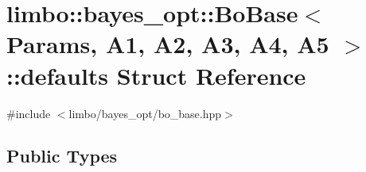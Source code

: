 \hypertarget{structlimbo_1_1bayes__opt_1_1_bo_base_1_1defaults}{}\section{limbo\+:\+:bayes\+\_\+opt\+:\+:Bo\+Base$<$ Params, A1, A2, A3, A4, A5 $>$\+:\+:defaults Struct Reference}
\label{structlimbo_1_1bayes__opt_1_1_bo_base_1_1defaults}


{\ttfamily \#include $<$limbo/bayes\+\_\+opt/bo\+\_\+base.\+hpp$>$}

\subsection*{Public Types}
